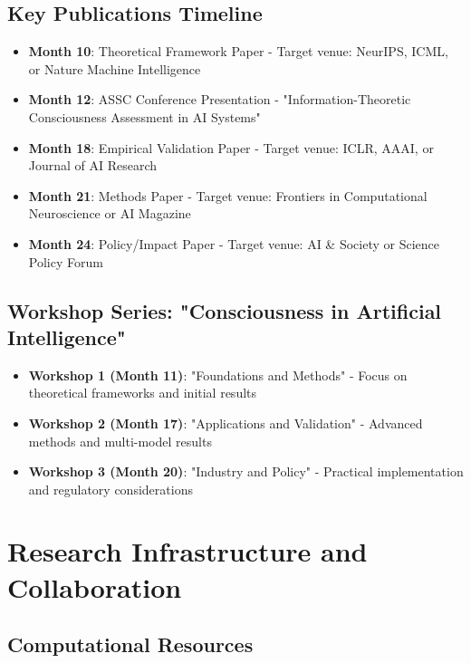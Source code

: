 \documentclass[11pt,a4paper]{article}
\begin{document}
\subsection{Key Publications Timeline}
\begin{itemize}
    \item \textbf{Month 10}: Theoretical Framework Paper - Target venue: NeurIPS, ICML, or Nature Machine Intelligence
    \item \textbf{Month 12}: ASSC Conference Presentation - "Information-Theoretic Consciousness Assessment in AI Systems"
    \item \textbf{Month 18}: Empirical Validation Paper - Target venue: ICLR, AAAI, or Journal of AI Research
    \item \textbf{Month 21}: Methods Paper - Target venue: Frontiers in Computational Neuroscience or AI Magazine
    \item \textbf{Month 24}: Policy/Impact Paper - Target venue: AI \& Society or Science Policy Forum
\end{itemize}

\subsection{Workshop Series: "Consciousness in Artificial Intelligence"}
\begin{itemize}
    \item \textbf{Workshop 1 (Month 11)}: "Foundations and Methods" - Focus on theoretical frameworks and initial results
    \item \textbf{Workshop 2 (Month 17)}: "Applications and Validation" - Advanced methods and multi-model results  
    \item \textbf{Workshop 3 (Month 20)}: "Industry and Policy" - Practical implementation and regulatory considerations
\end{itemize}
    \section{Research Infrastructure and Collaboration}

    \subsection{Computational Resources}
    
    
\end{document}
